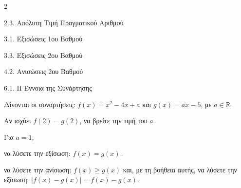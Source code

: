 \begin{ylh}{2}
    \item 2.3. Απόλυτη Τιμή Πραγματικού Αριθμού
    \item 3.1. Εξισώσεις 1ου Βαθμού
    \item 3.3. Εξισώσεις 2ου Βαθμού
    \item 4.2. Ανισώσεις 2ου Βαθμού
    \item 6.1. Η Έννοια της Συνάρτησης
\end{ylh}
Δίνονται οι συναρτήσεις: $f(x) = x^2 - 4x + a$ και $g(x) = a x - 5$, με $a \in \mathbb{R}$.
\begin{alist}
\item Αν ισχύει $f(2) = g(2)$, να βρείτε την τιμή του $a$.
\item Για $a = 1$,
\begin{rlist}
\item να λύσετε την εξίσωση: $f(x) = g(x)$.
\item να λύσετε την ανίσωση: $f(x) \ge g(x)$ και, με τη βοήθεια αυτής, να λύσετε την εξίσωση: $|f(x) - g(x)| = f(x) - g(x)$.

\end{rlist}
\end{alist}

